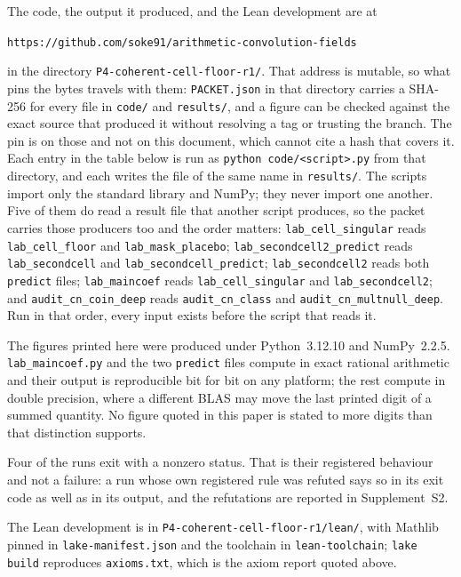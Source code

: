 \documentclass[11pt,a4paper]{article}
\theoremstyle{plain}
\theoremstyle{definition}
\theoremstyle{remark}
\begin{document}
The code, the output it produced, and the Lean development are at

\begin{center}
\texttt{https://github.com/soke91/arithmetic-convolution-fields}
\end{center}

\noindent in the directory \texttt{P4-coherent-cell-floor-r1/}. That
address is mutable, so what pins the bytes travels with them:
\texttt{PACKET.json} in that directory carries a SHA-256 for every file
in \texttt{code/} and \texttt{results/}, and a figure can be checked
against the exact source that produced it without resolving a tag or
trusting the branch. The pin is on those and not on this document,
which cannot cite a hash that covers it. Each entry
in the table below is run as
\texttt{python code/<script>.py} from that directory, and each writes
the file of the same name in \texttt{results/}. The scripts import only
the standard library and NumPy; they never import one another. Five of
them do read a result file that another script produces, so the packet
carries those producers too and the order matters:
\texttt{lab\_cell\_singular} reads \texttt{lab\_cell\_floor} and
\texttt{lab\_mask\_placebo}; \texttt{lab\_secondcell2\_predict} reads
\texttt{lab\_secondcell} and \texttt{lab\_secondcell\_predict};
\texttt{lab\_secondcell2} reads both \texttt{predict} files;
\texttt{lab\_maincoef} reads \texttt{lab\_cell\_singular} and
\texttt{lab\_secondcell2}; and \texttt{audit\_cn\_coin\_deep} reads
\texttt{audit\_cn\_class} and \texttt{audit\_cn\_multnull\_deep}. Run in
that order, every input exists before the script that reads it.

The figures printed here were produced under Python~3.12.10 and
NumPy~2.2.5. \texttt{lab\_maincoef.py} and the two \texttt{predict}
files compute in exact rational arithmetic and their output is
reproducible bit for bit on any platform; the rest compute in double
precision, where a different BLAS may move the last printed digit of a
summed quantity. No figure quoted in this paper is stated to more
digits than that distinction supports.

Four of the runs exit with a nonzero status. That is their registered
behaviour and not a failure: a run whose own registered rule was
refuted says so in its exit code as well as in its output, and the
refutations are reported in Supplement~S2.

The Lean development is in \texttt{P4-coherent-cell-floor-r1/lean/}, with
Mathlib pinned in \texttt{lake-manifest.json} and the toolchain in
\texttt{lean-toolchain}; \texttt{lake build} reproduces
\texttt{axioms.txt}, which is the axiom report quoted above.
\end{document}
